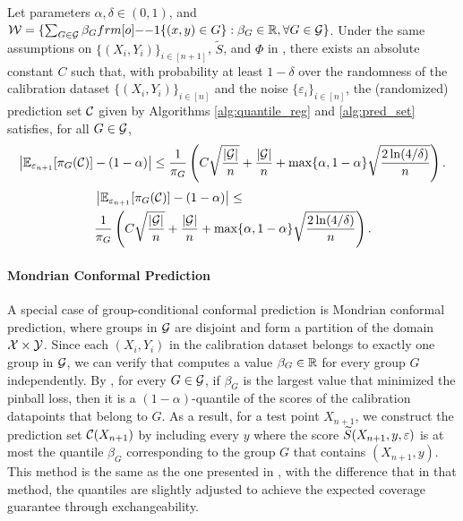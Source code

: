 \begin{corollary}
\label{cor: group-cond}
     Let parameters $\alpha,\delta \in (0,1)$, and $\calW = \{\sum_{G \in \calG} \beta_G \11\{(x,y) \in G\}: \beta_G \in \RR, \forall G \in \calG \}$. Under the same assumptions on $\{(X_i, Y_i)\}_{i\in [n+1]}$, $\tilde S$, and $\Phi$  in ,
there exists an absolute constant $C$ such that, with probability at least $1-\delta$ over the randomness of the calibration dataset $\{(X_i,Y_i)\}_{i\in [n]}$ and the noise $\{\varepsilon_i\}_{i \in [n]}$, the (randomized) prediction set ${\cal C}$ given by Algorithms \ref{alg:quantile_reg} and \ref{alg:pred_set} satisfies, for all $G \in {\cal G}$,
     \ifarxiv
     \begin{align*}
    \left|\mathbb{E}_{\varepsilon_{n+1}}[\pi_{G} ({\cal C})] -(1-\alpha)\right| \leq 
    \frac{1}{\pi_G}\left( C \sqrt{\frac{|{\cal G}|}{n}} + \frac{|{\cal G}|}{n} +\max \{\alpha, 1-\alpha\}\sqrt{\frac{2\ln(4/\delta)}{n}}  \right).
    \end{align*}
     \else
    \begin{align*}
    &\left|\mathbb{E}_{\varepsilon_{n+1}}[\pi_{G} ({\cal C})] -(1-\alpha)\right| \leq \\
    &{} 
    \frac{1}{\pi_G}\left( C \sqrt{\frac{|{\cal G}|}{n}} + \frac{|{\cal G}|}{n} +\max \{\alpha, 1-\alpha\}\sqrt{\frac{2\ln(4/\delta)}{n}}  \right).
    \end{align*}
    \fi
\end{corollary}

\paragraph{Mondrian Conformal Prediction}
A special case of group-conditional conformal prediction is Mondrian conformal prediction, where groups in ${\cal G}$ are disjoint and form a partition of the domain ${\cal X} \times {\cal Y}$. Since each $(X_i, Y_i)$ in the calibration dataset belongs to exactly one group in ${\cal G}$, we can verify that  computes a value $\beta_G \in \mathbb{R}$ for every group $G$ independently. By , for every $G \in {\cal G}$, if $\beta_G$ is the largest value that minimized the pinball loss, then it is a $(1-\alpha)$-quantile of the scores of the calibration datapoints that belong to $G$. As a result, for a test point $X_{n+1}$, we construct the prediction set ${\cal C}(X_{n+1})$ by including every $y$ where the score ${\widetilde{S}}(X_{n+1},y,\varepsilon)$ is at most the quantile $\beta_G$ corresponding to the group $G$ that contains $(X_{n+1},y)$. This method is the same as the one presented in \cite{VLNG03}, with the difference that in that method, the quantiles are slightly adjusted to achieve the expected coverage guarantee through exchangeability. 

